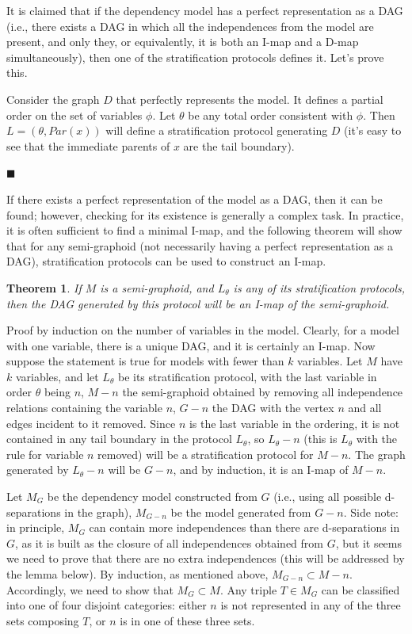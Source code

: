 \documentclass[fleqn]{article}
\newtheorem{theorem}{Theorem}
\numberwithin{equation}{section}
\numberwithin{theorem}{section}
\numberwithin{figure}{section}
\numberwithin{lemma}{section}
\numberwithin{corollary}{section}
\begin{document}
It is claimed that if the dependency model has a perfect representation as a DAG (i.e., there exists a DAG in which all the independences from the model are present, and only they, or equivalently, it is both an I-map and a D-map simultaneously), then one of the stratification protocols defines it. Let's prove this.

Consider the graph \( D \) that perfectly represents the model. It defines a partial order on the set of variables \( \phi \). Let \( \theta \) be any total order consistent with \( \phi \). Then \( L = (\theta, Par(x)) \) will define a stratification protocol generating \( D \) (it's easy to see that the immediate parents of \( x \) are the tail boundary).

\(\blacksquare\)

If there exists a perfect representation of the model as a DAG, then it can be found; however, checking for its existence is generally a complex task. In practice, it is often sufficient to find a minimal I-map, and the following theorem will show that for any semi-graphoid (not necessarily having a perfect representation as a DAG), stratification protocols can be used to construct an I-map.

\begin{theorem} If \( M \) is a semi-graphoid, and \( L_\theta \) is any of its stratification protocols, then the DAG generated by this protocol will be an I-map of the semi-graphoid.
\end{theorem}

Proof by induction on the number of variables in the model. Clearly, for a model with one variable, there is a unique DAG, and it is certainly an I-map. Now suppose the statement is true for models with fewer than \( k \) variables. Let \( M \) have \( k \) variables, and let \( L_\theta \) be its stratification protocol, with the last variable in order \( \theta \) being \( n \), \( M-n \) the semi-graphoid obtained by removing all independence relations containing the variable \( n \), \( G-n \) the DAG with the vertex \( n \) and all edges incident to it removed. Since \( n \) is the last variable in the ordering, it is not contained in any tail boundary in the protocol \( L_\theta \), so \( L_\theta - n \) (this is \( L_\theta \) with the rule for variable \( n \) removed) will be a stratification protocol for \( M-n \). The graph generated by \( L_\theta - n \) will be \( G-n \), and by induction, it is an I-map of \( M-n \).

Let \( M_G \) be the dependency model constructed from \( G \) (i.e., using all possible d-separations in the graph), \( M_{G-n} \) be the model generated from \( G-n \). Side note: in principle, \( M_G \) can contain more independences than there are d-separations in \( G \), as it is built as the closure of all independences obtained from \( G \), but it seems we need to prove that there are no extra independences (this will be addressed by the lemma below). By induction, as mentioned above, \( M_{G-n} \subset M-n \). Accordingly, we need to show that \( M_{G} \subset M \). Any triple \( T \in M_G \) can be classified into one of four disjoint categories: either \( n \) is not represented in any of the three sets composing \( T \), or \( n \) is in one of these three sets.
\end{document}
